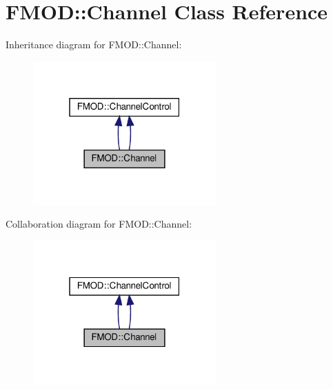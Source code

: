 \hypertarget{classFMOD_1_1Channel}{}\section{F\+M\+OD\+:\+:Channel Class Reference}
\label{classFMOD_1_1Channel}


Inheritance diagram for F\+M\+OD\+:\+:Channel\+:
\nopagebreak
\begin{figure}[H]
\begin{center}
\leavevmode
\includegraphics[width=199pt]{classFMOD_1_1Channel__inherit__graph}
\end{center}
\end{figure}


Collaboration diagram for F\+M\+OD\+:\+:Channel\+:
\nopagebreak
\begin{figure}[H]
\begin{center}
\leavevmode
\includegraphics[width=199pt]{classFMOD_1_1Channel__coll__graph}
\end{center}
\end{figure}
